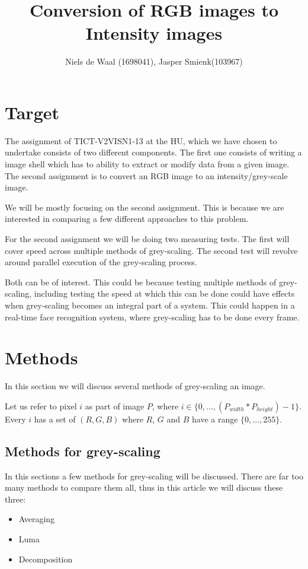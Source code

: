 \documentclass[a4paper]{article}
\begin{document}
\title{Conversion of RGB images to Intensity images}
\author{Niels de Waal (1698041), Jasper Smienk(103967)}
\maketitle
\newpage

\tableofcontents
\newpage

\section{Target}
The assignment of TICT-V2VISN1-13 at the HU, which we have chosen to undertake consists of two different components.
The first one consists of writing a image shell which has to ability to extract or modify data from a given image.
The second assignment is to convert an RGB image to an intensity/grey-scale image. 

We will be mostly focusing on the second assignment. This is because we are interested in comparing a few different approaches to this problem.

For the second assignment we will be doing two measuring tests. The first will cover speed across multiple methods of grey-scaling. The second test will revolve around parallel execution of the grey-scaling process.

Both can be of interest. This could be because testing multiple methods of grey-scaling, including testing the speed at which this can be done could have effects when grey-scaling becomes an integral part of a system. This could happen in a real-time face recognition system, where grey-scaling has to be done every frame.

\section{Methods}
In this section we will discuss several methods of grey-scaling an image.

Let us refer to pixel \(i\) as part of image \(P\), where \(i \in \{0, \dotsc , \left( P_{width} * P_{height} \right) - 1 \} \). Every \(i\) has a set of \( \left(R, G, B \right) \) where \(R\), \(G\) and \(B\) have a range \(\{0, \dotsc ,255 \} \).

\subsection{Methods for grey-scaling}
In this sections a few methods for grey-scaling will be discussed.
There are far too many methods to compare them all, thus in this article we will discuss these three:
\begin{itemize}
\item Averaging
\item Luma
\item Decomposition
\end{itemize}
\end{document}
